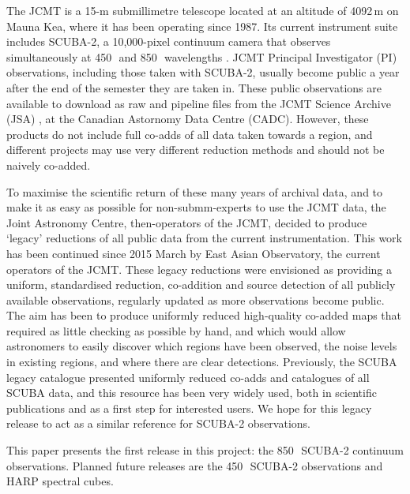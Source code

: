 \documentclass[twocolumn,times]{aastex6}
\newcommand{\um}{\micron}
\begin{document}
The JCMT is a 15-m submillimetre telescope located at an altitude of
4092\,m on Mauna Kea, where it has been operating since 1987. Its
current instrument suite includes SCUBA-2, a 10,000-pixel continuum
camera that observes simultaneously at 450\,\um\ and 850\,\um\
wavelengths \citep{Holland2013}.  JCMT Principal Investigator (PI)
observations, including
those taken with SCUBA-2, usually become public a year after the end
of the semester they are taken in. These public observations are
available to download as raw and pipeline files from the
JCMT Science Archive (JSA) \citep{2015Economou}, at the Canadian
Astornomy Data Centre (CADC). However, these products do not include
full co-adds of all data taken towards a region, and different projects
may use very different reduction methods and should not be
naively co-added.

To maximise the scientific return of these many years of archival
data, and to make it as easy as possible for non-submm-experts to use
the JCMT data, the Joint Astronomy Centre, then-operators of the JCMT,
decided to produce `legacy' reductions of all public data from the
current instrumentation. This work has been continued since 2015 March
by East Asian Observatory, the current operators of the JCMT. These
legacy reductions were envisioned as providing a uniform, standardised
reduction, co-addition and source detection of all publicly available
observations, regularly updated as more observations become
public. The aim has been to produce uniformly reduced high-quality
co-added maps that required as little checking as possible by hand,
and which would allow astronomers to easily discover which regions
have been observed, the noise levels in existing regions, and where
there are clear detections. Previously, the SCUBA legacy catalogue
\citep{DiFrancesco2008} presented uniformly reduced co-adds and
catalogues of all SCUBA data, and this resource has been very widely
used, both in scientific publications and as a first step for
interested users. We hope for this legacy release to act as a similar
reference for SCUBA-2 observations.

This paper presents the first release in this project: the 850\,\um\
SCUBA-2 continuum observations. Planned future releases are the
450\,\um\ SCUBA-2 observations and HARP spectral cubes.


\end{document}
